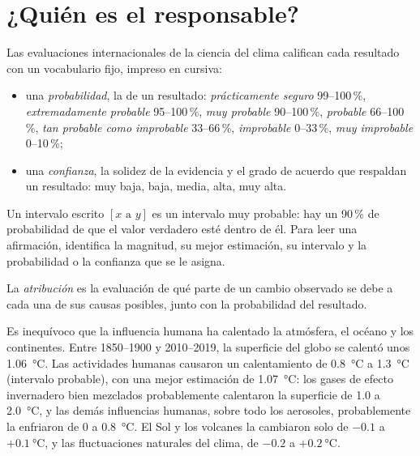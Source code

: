 \section{¿Quién es el responsable?}

\begin{method}\label{met:g12:climate-change:language}
Las evaluaciones internacionales de la ciencia del clima califican cada resultado con un
vocabulario fijo, impreso en cursiva:
\begin{itemize}
  \item una \emph{probabilidad}, la de un resultado:
        \emph{prácticamente seguro} 99--100\,\%, \emph{extremadamente probable}
        95--100\,\%, \emph{muy probable} 90--100\,\%, \emph{probable}
        66--100\,\%, \emph{tan probable como improbable} 33--66\,\%,
        \emph{improbable} 0--33\,\%, \emph{muy improbable} 0--10\,\%;
  \item una \emph{confianza}, la solidez de la evidencia y el grado de acuerdo
        que respaldan un resultado: muy baja, baja, media, alta, muy alta.
\end{itemize}
Un intervalo escrito $[x \text{ a } y]$ es un intervalo muy probable: hay un 90\,\%
de probabilidad de que el valor verdadero esté dentro de él. Para leer una afirmación, identifica
la magnitud, su mejor estimación, su intervalo y la probabilidad o la
confianza que se le asigna.
\end{method}

\begin{definition}[Atribución]\label{def:g12:climate-change:attribution}
La \emph{atribución} es la evaluación de qué parte de un
cambio observado se debe a cada una de sus causas posibles, junto con la probabilidad
del resultado.
\end{definition}

\begin{proposition}\label{prop:g12:climate-change:attribution}
Es inequívoco que la influencia humana ha calentado la atmósfera, el océano
y los continentes. Entre 1850--1900 y 2010--2019, la superficie del globo se calentó
unos \qty{1.06}{\degreeCelsius}. Las actividades humanas causaron un calentamiento de
\qty{0.8}{\degreeCelsius} a \qty{1.3}{\degreeCelsius} (intervalo probable), con una mejor
estimación de \qty{1.07}{\degreeCelsius}: los gases de efecto invernadero bien mezclados probablemente
calentaron la superficie de 1.0 a \qty{2.0}{\degreeCelsius}, y las demás influencias
humanas, sobre todo los aerosoles, probablemente la enfriaron de 0 a
\qty{0.8}{\degreeCelsius}. El Sol y los volcanes la cambiaron solo de $-0.1$
a $+\qty{0.1}{\degreeCelsius}$, y las fluctuaciones naturales del clima,
de $-0.2$ a $+\qty{0.2}{\degreeCelsius}$.
\end{proposition}


